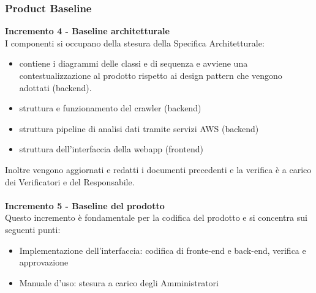 {{    \subsubsection{Product Baseline} {
    \textbf{Incremento 4 - Baseline architetturale} \\
    I componenti si occupano della stesura della Specifica Architetturale: 
    \begin{itemize}
        \item contiene i diagrammi delle classi e di sequenza e avviene una contestualizzazione al prodotto rispetto ai design pattern che vengono adottati (backend).
        \item struttura e funzionamento del crawler (backend)
        \item struttura pipeline di analisi dati tramite servizi AWS (backend)
        \item struttura dell'interfaccia della webapp (frontend)
    \end{itemize}
    Inoltre vengono aggiornati e redatti i documenti precedenti e la verifica è a carico dei Verificatori e del Responsabile.\\ \\
    \textbf{Incremento 5 - Baseline del prodotto} \\
    Questo incremento è fondamentale per la codifica del prodotto e si concentra sui seguenti punti:
    \begin{itemize}
        \item Implementazione dell'interfaccia: codifica di fronte-end e back-end, verifica e approvazione 
        \item Manuale d'uso: stesura a carico degli Amministratori
    \end{itemize}
    }

}}
